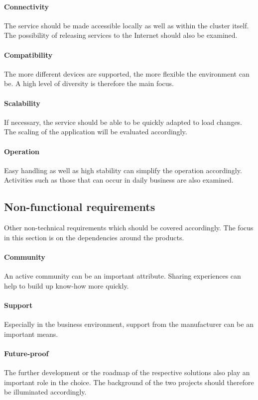 \documentclass[MIC,Master,english]{twbook}%
\begin{document}
\paragraph{Connectivity} The service should be made accessible locally as well as within the cluster itself. The possibility of releasing services to the Internet should also be examined.
\paragraph{Compatibility} The more different devices are supported, the more flexible the environment can be. A high level of diversity is therefore the main focus.
\paragraph{Scalability} If necessary, the service should be able to be quickly adapted to load changes. The scaling of the application will be evaluated accordingly.
\paragraph{Operation} Easy handling as well as high stability can simplify the operation accordingly. Activities such as those that can occur in daily business are also examined.


\subsection{Non-functional requirements}
Other non-technical requirements which should be covered accordingly. The focus in this section is on the dependencies around the products.
\paragraph{Community} An active community can be an important attribute. Sharing experiences can help to build up know-how more quickly.
\paragraph{Support} Especially in the business environment, support from the manufacturer can be an important means.
\paragraph{Future-proof} The further development or the roadmap of the respective solutions also play an important role in the choice. The background of the two projects should therefore be illuminated accordingly.
\end{document}
